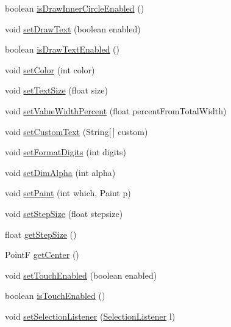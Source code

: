 \begin{DoxyCompactItemize}
\item 
boolean \hyperlink{classcs_1_1usense_1_1_circle_display_aebb5f5a3d61d38ff50df545a755118aa}{is\+Draw\+Inner\+Circle\+Enabled} ()
\item 
void \hyperlink{classcs_1_1usense_1_1_circle_display_a73afe8f32734cf4ec48a7f9c82cc121a}{set\+Draw\+Text} (boolean enabled)
\item 
boolean \hyperlink{classcs_1_1usense_1_1_circle_display_a6a853c2bf9f15029f028ed0a8c376f96}{is\+Draw\+Text\+Enabled} ()
\item 
void \hyperlink{classcs_1_1usense_1_1_circle_display_ad0329a1f0def90c44833f315b026125c}{set\+Color} (int color)
\item 
void \hyperlink{classcs_1_1usense_1_1_circle_display_a7fe23960459b02b82bea8c775c2600fc}{set\+Text\+Size} (float size)
\item 
void \hyperlink{classcs_1_1usense_1_1_circle_display_ab29b4b9ee0f366107db3e529b90f3bd3}{set\+Value\+Width\+Percent} (float percent\+From\+Total\+Width)
\item 
void \hyperlink{classcs_1_1usense_1_1_circle_display_a352f70303fff1a415ea7e86fe5cd9b8a}{set\+Custom\+Text} (String\mbox{[}$\,$\mbox{]} custom)
\item 
void \hyperlink{classcs_1_1usense_1_1_circle_display_a9da10f3e16fcde61b4cae1597f112433}{set\+Format\+Digits} (int digits)
\item 
void \hyperlink{classcs_1_1usense_1_1_circle_display_a79d0429500ef1fc93d7fa8e26d6969dd}{set\+Dim\+Alpha} (int alpha)
\item 
void \hyperlink{classcs_1_1usense_1_1_circle_display_a3a90aea950adf837c7b2767fa8520720}{set\+Paint} (int which, Paint p)
\item 
void \hyperlink{classcs_1_1usense_1_1_circle_display_a10c395b66369a1e78fbf028b9ef48c8b}{set\+Step\+Size} (float stepsize)
\item 
float \hyperlink{classcs_1_1usense_1_1_circle_display_a709372dafdfa1124cea7b27d27115257}{get\+Step\+Size} ()
\item 
Point\+F \hyperlink{classcs_1_1usense_1_1_circle_display_a62f6741d2a4297b6668b0b18d7379d63}{get\+Center} ()
\item 
void \hyperlink{classcs_1_1usense_1_1_circle_display_ab754f5a945b89eef46026882f9cb8393}{set\+Touch\+Enabled} (boolean enabled)
\item 
boolean \hyperlink{classcs_1_1usense_1_1_circle_display_ab741e532c8b1ac28b54bf56c326e5f6e}{is\+Touch\+Enabled} ()
\item 
void \hyperlink{classcs_1_1usense_1_1_circle_display_ab930a42469dd10afd174c574850767d9}{set\+Selection\+Listener} (\hyperlink{interfacecs_1_1usense_1_1_circle_display_1_1_selection_listener}{Selection\+Listener} l)

\end{DoxyCompactItemize}
